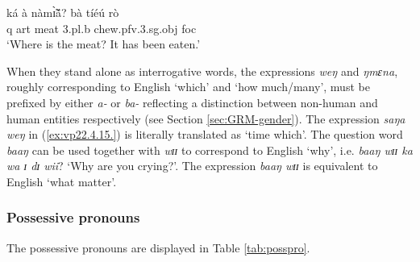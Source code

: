 \begin{exe}
\begin{exe}
\begin{exe}
{\begin{exe}
\begin{exe}
\begin{exe}
\begin{exe}
\begin{exe}
\begin{exe}
\begin{exe}
\begin{xlist}
\begin{exe}
\begin{exe}
\gll ká à nàmɪ̃̀ã́?  bà tíéú rò\\
      {\sc q} {\sc art} meat {\sc 3.pl.b} chew.{\sc pfv}.{\sc 3.sg.obj} {\sc
foc}\\
\glt  `Where is the meat? It has been eaten.'

\end{exe}





When they stand alone as interrogative words, the
expressions {\it weŋ} and {\it ŋmɛna}, roughly
corresponding to English `which' and `how much/many', must be prefixed by either
{\it a-} or {\it ba-} reflecting a distinction between non-human and human 
entities respectively (see Section \ref{sec:GRM-gender}). The expression {\it 
saŋa weŋ} in (\ref{ex:vp22.4.15.}) is
literally translated as `time which'.     The question word {\it baaŋ} can be 
used together with {\it wɪɪ} to correspond to English `why', i.e.
{\it baaŋ wɪɪ ka wa ɪ dɪ wii}? `Why are you crying?'.  The expression {\it baaŋ
wɪɪ} is equivalent to English `what matter'. 










\subsubsection{Possessive pronouns}
\label{secːGRM-poss-pro}

The possessive pronouns are displayed in Table \ref{tab:posspro}. 


\end{exe}
\end{xlist}
\end{exe}
\end{exe}
\end{exe}
\end{exe}
\end{exe}
\end{exe}
\end{exe}}
\end{exe}
\end{exe}
\end{exe}
